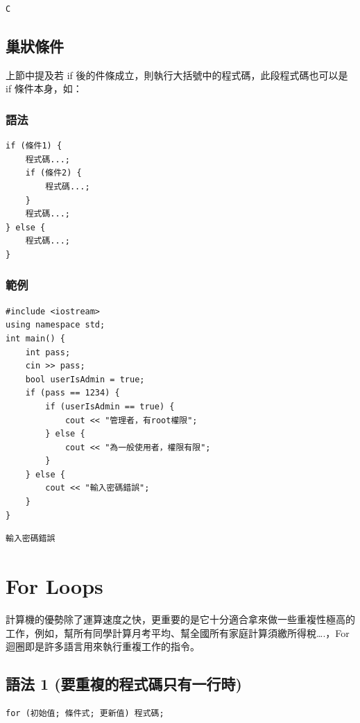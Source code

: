 \documentclass[12pt,a4paper]{article}
\begin{document}
\begin{verbatim}
C
\end{verbatim}

\subsection{巢狀條件}
\label{sec:org09f64fb}
上節中提及若 if 後的件條成立，則執行大括號中的程式碼，此段程式碼也可以是 if 條件本身，如：
\subsubsection{語法}
\label{sec:orgc254843}
\lstset{breaklines=true,language=cpp,label= ,caption= ,captionpos=b,numbers=none}
\begin{lstlisting}
if (條件1) {
    程式碼...;
    if (條件2) {
        程式碼...;
    }
    程式碼...;
} else {
    程式碼...;
}
\end{lstlisting}
\subsubsection{範例}
\label{sec:org4167f4f}
\lstset{breaklines=true,language=cpp,label= ,caption= ,captionpos=b,firstnumber=1,numbers=left}
\begin{lstlisting}
#include <iostream>
using namespace std;
int main() {
    int pass;
    cin >> pass;
    bool userIsAdmin = true;
    if (pass == 1234) {
        if (userIsAdmin == true) {
            cout << "管理者，有root權限";
        } else {
            cout << "為一般使用者，權限有限";
        }
    } else {
        cout << "輸入密碼錯誤";
    }
}
\end{lstlisting}

\begin{verbatim}
輸入密碼錯誤
\end{verbatim}

\section{For Loops}
\label{cpp_for_loop}
計算機的優勢除了運算速度之快，更重要的是它十分適合拿來做一些重複性極高的工作，例如，幫所有同學計算月考平均、幫全國所有家庭計算須繳所得稅\ldots{}.，For 迴圈即是許多語言用來執行重複工作的指令。
\subsection{語法 1 (要重複的程式碼只有一行時)}
\label{sec:orgd01db5f}
\lstset{breaklines=true,language=cpp,label= ,caption= ,captionpos=b,firstnumber=1,numbers=left}
\begin{lstlisting}
for (初始值; 條件式; 更新值) 程式碼;
\end{lstlisting}
\end{document}
